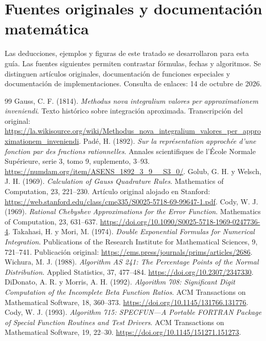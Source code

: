 \documentclass[11pt,a4paper]{article}
\theoremstyle{definition}
\begin{document}
\section{Fuentes originales y documentación matemática}
Las deducciones, ejemplos y figuras de este tratado se desarrollaron para esta guía. Las fuentes siguientes permiten contrastar fórmulas, fechas y algoritmos. Se distinguen artículos originales, documentación de funciones especiales y documentación de implementaciones. Consulta de enlaces: 14 de octubre de 2026.
\begingroup\small\raggedright\setlength{\parskip}{2pt}
\begin{thebibliography}{99}
 Gauss, C. F. (1814). \textit{Methodus nova integralium valores per approximationem inveniendi}. Texto histórico sobre integración aproximada. Transcripción del original: \url{https://la.wikisource.org/wiki/Methodus_nova_integralium_valores_per_approximationem_inveniendi}.
 Padé, H. (1892). \textit{Sur la représentation approchée d'une fonction par des fractions rationnelles}. Annales scientifiques de l'École Normale Supérieure, serie 3, tomo 9, suplemento, 3--93. \url{https://numdam.org/item/ASENS_1892_3_9__S3_0/}.
 Golub, G. H. y Welsch, J. H. (1969). \textit{Calculation of Gauss Quadrature Rules}. Mathematics of Computation, 23, 221--230. Artículo original alojado en Stanford: \url{https://web.stanford.edu/class/cme335/S0025-5718-69-99647-1.pdf}.
 Cody, W. J. (1969). \textit{Rational Chebyshev Approximations for the Error Function}. Mathematics of Computation, 23, 631--637. \url{https://doi.org/10.1090/S0025-5718-1969-0247736-4}.
 Takahasi, H. y Mori, M. (1974). \textit{Double Exponential Formulas for Numerical Integration}. Publications of the Research Institute for Mathematical Sciences, 9, 721--741. Publicación original: \url{https://ems.press/journals/prims/articles/2686}.
 Wichura, M. J. (1988). \textit{Algorithm AS 241: The Percentage Points of the Normal Distribution}. Applied Statistics, 37, 477--484. \url{https://doi.org/10.2307/2347330}.
 DiDonato, A. R. y Morris, A. H. (1992). \textit{Algorithm 708: Significant Digit Computation of the Incomplete Beta Function Ratios}. ACM Transactions on Mathematical Software, 18, 360--373. \url{https://doi.org/10.1145/131766.131776}.
 Cody, W. J. (1993). \textit{Algorithm 715: SPECFUN---A Portable FORTRAN Package of Special Function Routines and Test Drivers}. ACM Transactions on Mathematical Software, 19, 22--30. \url{https://doi.org/10.1145/151271.151273}.

\end{thebibliography}
\end{document}
